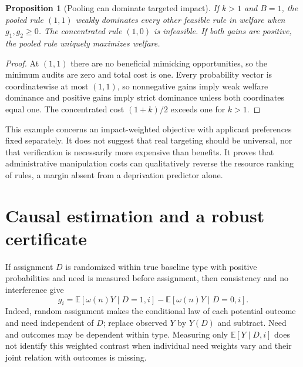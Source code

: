 \documentclass[11pt]{article}
\newtheorem{proposition}[theorem]{Proposition}
\theoremstyle{remark}
\newcommand{\E}{\mathbb E}
\begin{document}
\begin{proposition}[Pooling can dominate targeted impact]
If $k>1$ and $B=1$, the pooled rule $(1,1)$ weakly dominates every other feasible rule in welfare when $g_1,g_2\geq0$. The concentrated rule $(1,0)$ is infeasible. If both gains are positive, the pooled rule uniquely maximizes welfare.
\end{proposition}
\begin{proof}
At $(1,1)$ there are no beneficial mimicking opportunities, so the minimum audits are zero and total cost is one. Every probability vector is coordinatewise at most $(1,1)$, so nonnegative gains imply weak welfare dominance and positive gains imply strict dominance unless both coordinates equal one. The concentrated cost $(1+k)/2$ exceeds one for $k>1$.
\end{proof}

This example concerns an impact-weighted objective with applicant preferences fixed separately. It does not suggest that real targeting should be universal, nor that verification is necessarily more expensive than benefits. It proves that administrative manipulation costs can qualitatively reverse the resource ranking of rules, a margin absent from a deprivation predictor alone.

\section{Causal estimation and a robust certificate}
If assignment $D$ is randomized within true baseline type with positive probabilities and need is measured before assignment, then consistency and no interference give
\[
 g_i=\E[\omega(n)Y\mid D=1,i]-\E[\omega(n)Y\mid D=0,i].
\]
Indeed, random assignment makes the conditional law of each potential outcome and need independent of $D$; replace observed $Y$ by $Y(D)$ and subtract. Need and outcomes may be dependent within type. Measuring only $\E[Y\mid D,i]$ does not identify this weighted contrast when individual need weights vary and their joint relation with outcomes is missing.
\end{document}
